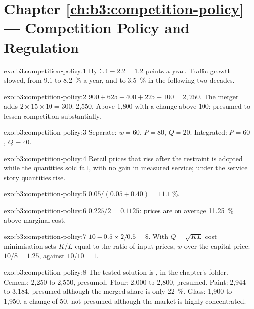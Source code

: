 \section*{Chapter \ref{ch:b3:competition-policy} --- Competition Policy and Regulation}

\begin{solution}{exo:b3:competition-policy:1}
By $3.4 - 2.2 = 1.2$ points a year. Traffic growth slowed, from 9.1 to 8.2~\% a year, and to 3.5~\% in the
following two decades. %
\end{solution}

\begin{solution}{exo:b3:competition-policy:2}
$900 + 625 + 400 + 225 + 100 = 2{,}250$. The merger adds $2 \times 15 \times 10 = 300$: 2{,}550. Above 1{,}800 with a change above 100: presumed
to lessen competition substantially.
\end{solution}

\begin{solution}{exo:b3:competition-policy:3}
Separate: $w = 60$, $P = 80$, $Q = 20$. Integrated: $P = 60$, $Q = 40$.
\end{solution}

\begin{solution}{exo:b3:competition-policy:4}
Retail prices that rise after the restraint is adopted while the quantities sold
fall, with no gain in measured service; under the service story quantities rise.
\end{solution}

\begin{solution}{exo:b3:competition-policy:5}
$0.05/(0.05 + 0.40) = 11.1~\%$.
\end{solution}

\begin{solution}{exo:b3:competition-policy:6}
$0.225/2 = 0.1125$: prices are on average 11.25~\% above marginal cost.
\end{solution}

\begin{solution}{exo:b3:competition-policy:7}
$10 - 0.5 \times 2/0.5 = 8$. With $Q = \sqrt{KL}$ cost minimisation sets $K/L$ equal to the ratio of input prices, $w$ over
the capital price: $10/8 = 1.25$, against $10/10 = 1$.
\end{solution}

\begin{solution}{exo:b3:competition-policy:8}
The tested solution is , in the chapter's 
folder. Cement: 2{,}250 to 2{,}550, presumed. Flour: 2{,}000 to 2{,}800, presumed. Paint: 2{,}944 to 3{,}184, presumed although
the merged share is only 22~\%. Glass: 1{,}900 to 1{,}950, a change of 50, not presumed although the
market is highly concentrated. %
\end{solution}

